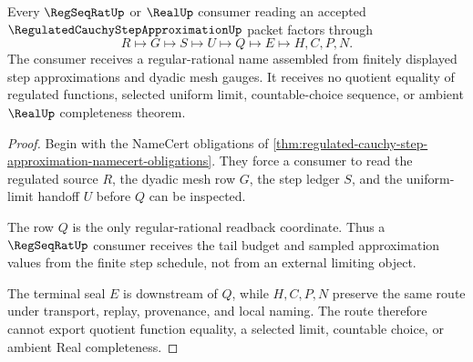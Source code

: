 \begin{theorem}
\label{thm:regulated-cauchy-step-approximation-regseqrat-handoff}
Every $\RegSeqRatUp$ or $\RealUp$ consumer reading an accepted $\RegulatedCauchyStepApproximationUp$ packet factors through
$$
R \longmapsto G \longmapsto S \longmapsto U \longmapsto Q \longmapsto E \longmapsto H,C,P,N .
$$
The consumer receives a regular-rational name assembled from finitely displayed step approximations and dyadic mesh gauges. It receives no quotient equality of regulated functions, selected uniform limit, countable-choice sequence, or ambient $\RealUp$ completeness theorem.
\end{theorem}
\begin{proof}
Begin with the NameCert obligations of \autoref{thm:regulated-cauchy-step-approximation-namecert-obligations}. They force a consumer to read the regulated source $R$, the dyadic mesh row $G$, the step ledger $S$, and the uniform-limit handoff $U$ before $Q$ can be inspected.

The row $Q$ is the only regular-rational readback coordinate. Thus a $\RegSeqRatUp$ consumer receives the tail budget and sampled approximation values from the finite step schedule, not from an external limiting object.

The terminal seal $E$ is downstream of $Q$, while $H,C,P,N$ preserve the same route under transport, replay, provenance, and local naming. The route therefore cannot export quotient function equality, a selected limit, countable choice, or ambient Real completeness.
\end{proof}


\begin{closurestatus}{\RegulatedCauchyStepApproximationUp}
  \theoryclosure{\seedClosure}
  \formalstatus{\unformalizedV}
\end{closurestatus}
